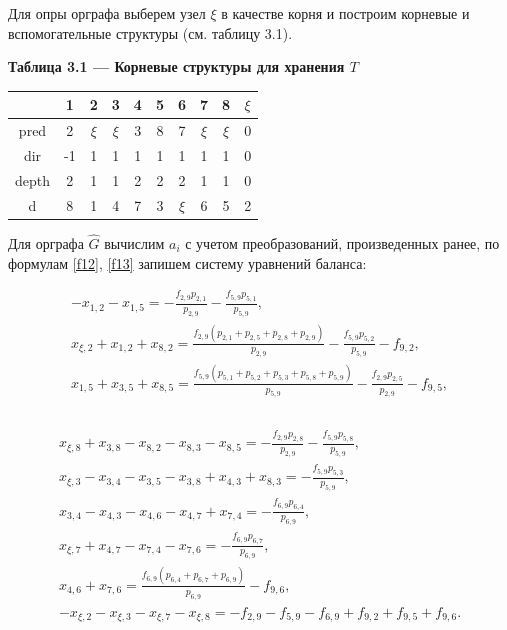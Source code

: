 \documentclass[14pt]{extarticle}%
\begin{document}
Для опры орграфа выберем узел $\xi$ в качестве корня и построим корневые и вспомогательные структуры (см. таблицу 3.1).

\begin{center}
\textbf{Таблица 3.1 --- Корневые структуры для хранения $T$}\\
\begin{tabular}{c|ccccccccc}
  &1&2&3&4&5&6&7&8&$\xi$\\\hline
 pred&2 & $\xi$ & $\xi$ & 3 & 8 & 7 & $\xi$ & $\xi$ & 0 \\
 dir& -1 & 1 & 1 & 1 & 1 & 1 & 1 & 1 & 0 \\
 depth&2 & 1 & 1 & 2 & 2 & 2 & 1 & 1 & 0 \\
 d&8 & 1 & 4 & 7 & 3 & $\xi$ & 6 & 5 & 2 \\
\end{tabular}
\end{center}

Для орграфа $\widehat{G}$ вычислим $a_i$ с учетом преобразований, произведенных ранее, по формулам \eqref{f12}, \eqref{f13} запишем систему уравнений баланса:

\begin{equation*}\begin{gathered}
	-x_{1,2}-x_{1,5}=-\frac{f_{2,9} p_{2,1}}{p_{2,9}}-\frac{f_{5,9} p_{5,1}}{p_{5,9}},\\
	x_{\xi ,2}+x_{1,2}+x_{8,2}=\frac{f_{2,9} \left(p_{2,1}+p_{2,5}+p_{2,8}+p_{2,9}\right)}{p_{2,9}}-\frac{f_{5,9} p_{5,2}}{p_{5,9}}-f_{9,2},\\
	x_{1,5}+x_{3,5}+x_{8,5}=\frac{f_{5,9} \left(p_{5,1}+p_{5,2}+p_{5,3}+p_{5,8}+p_{5,9}\right)}{p_{5,9}}-\frac{f_{2,9} p_{2,5}}{p_{2,9}}-f_{9,5},\\
	\end{gathered}
	\end{equation*}\\
	\begin{equation}\label{f3.1.1}
	\begin{gathered}
	x_{\xi ,8}+x_{3,8}-x_{8,2}-x_{8,3}-x_{8,5}=-\frac{f_{2,9} p_{2,8}}{p_{2,9}}-\frac{f_{5,9} p_{5,8}}{p_{5,9}},\\
	x_{\xi ,3}-x_{3,4}-x_{3,5}-x_{3,8}+x_{4,3}+x_{8,3}=-\frac{f_{5,9} p_{5,3}}{p_{5,9}},\\
	x_{3,4}-x_{4,3}-x_{4,6}-x_{4,7}+x_{7,4}=-\frac{f_{6,9} p_{6,4}}{p_{6,9}},\\
	x_{\xi ,7}+x_{4,7}-x_{7,4}-x_{7,6}=-\frac{f_{6,9} p_{6,7}}{p_{6,9}},\\
	x_{4,6}+x_{7,6}=\frac{f_{6,9} \left(p_{6,4}+p_{6,7}+p_{6,9}\right)}{p_{6,9}}-f_{9,6},\\
	-x_{\xi ,2}-x_{\xi ,3}-x_{\xi ,7}-x_{\xi ,8}=-f_{2,9}-f_{5,9}-f_{6,9}+f_{9,2}+f_{9,5}+f_{9,6}.
	\end{gathered}
\end{equation}
\end{document}
